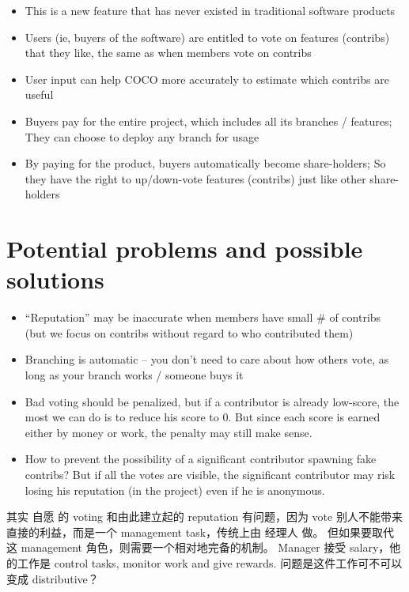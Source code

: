 \documentclass[12pt, orivec]{article}
\begin{document}
\begin{itemize}
	\item This is a new feature that has never existed in traditional software products
	
	\item Users (ie, buyers of the software) are entitled to vote on features (contribs) that they like, the same as when members vote on contribs
	
	\item User input can help COCO more accurately to estimate which contribs are useful

	\item Buyers pay for the entire project, which includes all its branches / features;  They can choose to deploy any branch for usage

	\item By paying for the product, buyers automatically become share-holders;  So they have the right to up/down-vote features (contribs) just like other share-holders
\end{itemize}

\secttoc
\section{Potential problems and possible solutions}

\begin{itemize}
	\item ``Reputation'' may be inaccurate when members have small \# of contribs (but we focus on contribs without regard to who contributed them)
	
	\item Branching is automatic -- you don't need to care about how others vote, as long as your branch works / someone buys it
	
	\item Bad voting should be penalized, but if a contributor is already low-score, the most we can do is to reduce his score to 0.  But since each score is earned either by money or work, the penalty may still make sense.
	
	\item How to prevent the possibility of a significant contributor spawning fake contribs?  But if all the votes are visible, the significant contributor may risk losing his reputation (in the project) even if he is anonymous.
\end{itemize}

其实 自愿 的 voting 和由此建立起的 reputation 有问题，因为 vote 别人不能带来直接的利益，而是一个 management task，传统上由 经理人 做。  但如果要取代这 management 角色，则需要一个相对地完备的机制。   Manager 接受 salary，他的工作是 control tasks, monitor work and give rewards.   问题是这件工作可不可以变成 distributive？  
\end{document}
